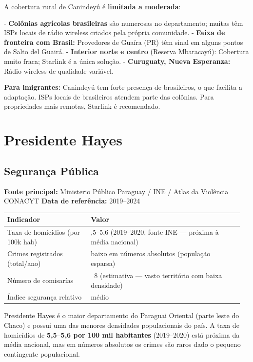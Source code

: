 A cobertura rural de Canindeyú é \textbf{limitada a moderada}:

- \textbf{Colônias agrícolas brasileiras} são numerosas no departamento; muitas têm ISPs locais de rádio wireless criados pela própria comunidade.
- \textbf{Faixa de fronteira com Brasil:} Provedores de Guaíra (PR) têm sinal em alguns pontos de Salto del Guairá.
- \textbf{Interior norte e centro} (Reserva Mbaracayú): Cobertura muito fraca; Starlink é a única solução.
- \textbf{Curuguaty, Nueva Esperanza:} Rádio wireless de qualidade variável.

\textbf{Para imigrantes:} Canindeyú tem forte presença de brasileiros, o que facilita a adaptação. ISPs locais de brasileiros atendem parte das colônias. Para propriedades mais remotas, Starlink é recomendado.





\clearpage
\section{Presidente Hayes}
\label{sec:dept_15_Presidente_Hayes}

\subsection{Segurança Pública}

\textbf{Fonte principal:} Ministerio Público Paraguay / INE / Atlas da Violência CONACYT
\textbf{Data de referência:} 2019--2024


{\small
\setlength{\tabcolsep}{3pt}
\renewcommand{\arraystretch}{1.12}
\begin{tabularx}{\linewidth}{>{\raggedright\arraybackslash}p{0.34\linewidth} >{\raggedright\arraybackslash}p{0.62\linewidth}}
\toprule
Indicador & Valor \\
\midrule
Taxa de homicídios (por 100k hab) & 5,5--5,6 (2019--2020, fonte INE --- próxima à média nacional) \\
Crimes registrados (total/ano) & baixo em números absolutos (população esparsa) \\
Número de comisarías & ~8 (estimativa --- vasto território com baixa densidade) \\
Índice segurança relativo & médio \\
\bottomrule
\end{tabularx}
}


Presidente Hayes é o maior departamento do Paraguai Oriental (parte leste do Chaco) e possui uma das menores densidades populacionais do país. A taxa de homicídios de \textbf{5,5--5,6 por 100 mil habitantes} (2019--2020) está próxima da média nacional, mas em números absolutos os crimes são raros dado o pequeno contingente populacional.

